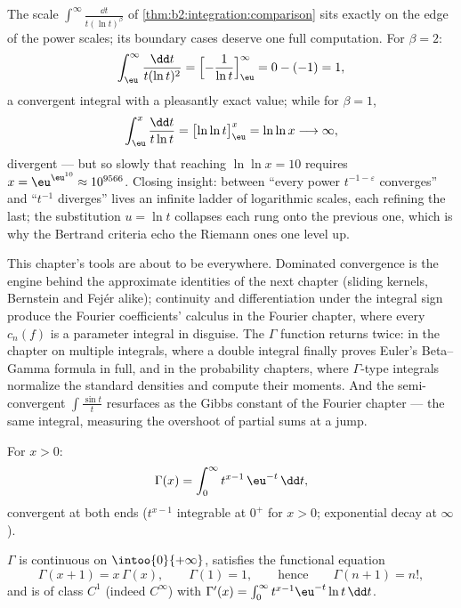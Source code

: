 \begin{example}\label{ex:b2:integration:bertrandboundary}
The scale $\int^\infty\frac{\dd t}{t(\ln t)^\beta}$ of
\cref{thm:b2:integration:comparison} sits exactly on the edge
of the power scales; its boundary cases deserve one full
computation. For $\beta = 2$:
\[
\int_\eu^{\infty}\frac{\dd t}{t(\ln t)^2}
= \Bigl[-\frac{1}{\ln t}\Bigr]_\eu^{\infty}
= 0 - (-1) = 1 ,
\]
a convergent integral with a pleasantly exact value; while for
$\beta = 1$,
\[
\int_\eu^{x}\frac{\dd t}{t\ln t}
= \bigl[\ln\ln t\bigr]_\eu^{x} = \ln\ln x
\longrightarrow \infty ,
\]
divergent --- but so slowly that reaching $\ln\ln x = 10$
requires $x = \eu^{\eu^{10}} \approx 10^{9566}$. Closing
insight: between ``every power $t^{-1-\varepsilon}$
converges'' and ``$t^{-1}$ diverges'' lives an infinite ladder
of logarithmic scales, each refining the last; the substitution
$u = \ln t$ collapses each rung onto the previous one, which
is why the Bertrand criteria echo the Riemann ones one level
up.
\end{example}

\begin{remark}
This chapter's tools are about to be everywhere. Dominated
convergence is the engine behind the approximate identities of
the next chapter (sliding kernels, Bernstein and Fej\'er
alike); continuity and differentiation under the integral sign
produce the Fourier coefficients' calculus in the Fourier
chapter, where every $c_n(f)$ is a parameter integral in
disguise. The $\Gamma$ function returns twice: in the chapter
on multiple integrals, where a double integral finally proves
Euler's Beta--Gamma formula in full, and in the probability
chapters, where $\Gamma$-type integrals normalize the standard
densities and compute their moments. And the semi-convergent
$\int\frac{\sin t}{t}$ resurfaces as the Gibbs constant of the
Fourier chapter --- the same integral, measuring the overshoot
of partial sums at a jump.
\end{remark}

\begin{definition}\label{def:b2:integration:gamma}
For $x > 0$:
\[
\Gamma(x) = \int_0^{\infty} t^{x-1}\,\eu^{-t}\,\dd t ,
\]
convergent at both ends ($t^{x-1}$ integrable at $0^+$ for $x > 0$;
exponential decay at $\infty$).
\end{definition}

\begin{theorem}\label{thm:b2:integration:gammaprops}
$\Gamma$ is continuous on $\intoo{0}{+\infty}$, satisfies the
functional equation
\[
\Gamma(x + 1) = x\,\Gamma(x),
\qquad \Gamma(1) = 1,
\qquad\text{hence}\qquad \Gamma(n + 1) = n! ,
\]
and is of class $C^1$ (indeed $C^\infty$) with $\Gamma'(x) =
\int_0^\infty t^{x-1}\eu^{-t}\ln t\,\dd t$.
\end{theorem}


